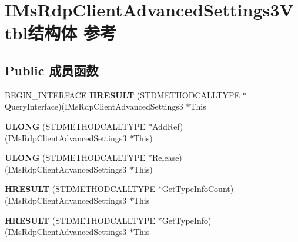 \hypertarget{struct_i_ms_rdp_client_advanced_settings3_vtbl}{}\section{I\+Ms\+Rdp\+Client\+Advanced\+Settings3\+Vtbl结构体 参考}
\label{struct_i_ms_rdp_client_advanced_settings3_vtbl}
\subsection*{Public 成员函数}
\begin{DoxyCompactItemize}
\item 
\mbox{\label{struct_i_ms_rdp_client_advanced_settings3_vtbl_a8f6d5e75d19efe4f0e09aeab838e5f19}} 
B\+E\+G\+I\+N\+\_\+\+I\+N\+T\+E\+R\+F\+A\+CE {\bfseries H\+R\+E\+S\+U\+LT} (S\+T\+D\+M\+E\+T\+H\+O\+D\+C\+A\+L\+L\+T\+Y\+PE $\ast$Query\+Interface)(I\+Ms\+Rdp\+Client\+Advanced\+Settings3 $\ast$This
\item 
\mbox{\label{struct_i_ms_rdp_client_advanced_settings3_vtbl_adad314645d965506fa7694e3a67dcc13}} 
{\bfseries U\+L\+O\+NG} (S\+T\+D\+M\+E\+T\+H\+O\+D\+C\+A\+L\+L\+T\+Y\+PE $\ast$Add\+Ref)(I\+Ms\+Rdp\+Client\+Advanced\+Settings3 $\ast$This)
\item 
\mbox{\label{struct_i_ms_rdp_client_advanced_settings3_vtbl_a4d757adae08a41e9eed936320e60cabb}} 
{\bfseries U\+L\+O\+NG} (S\+T\+D\+M\+E\+T\+H\+O\+D\+C\+A\+L\+L\+T\+Y\+PE $\ast$Release)(I\+Ms\+Rdp\+Client\+Advanced\+Settings3 $\ast$This)
\item 
\mbox{\label{struct_i_ms_rdp_client_advanced_settings3_vtbl_ae80f8694813050b1dd2f8fb9b12e8f93}} 
{\bfseries H\+R\+E\+S\+U\+LT} (S\+T\+D\+M\+E\+T\+H\+O\+D\+C\+A\+L\+L\+T\+Y\+PE $\ast$Get\+Type\+Info\+Count)(I\+Ms\+Rdp\+Client\+Advanced\+Settings3 $\ast$This
\item 
\mbox{\label{struct_i_ms_rdp_client_advanced_settings3_vtbl_a48859c33ee617bd43a3216d3a9015817}} 
{\bfseries H\+R\+E\+S\+U\+LT} (S\+T\+D\+M\+E\+T\+H\+O\+D\+C\+A\+L\+L\+T\+Y\+PE $\ast$Get\+Type\+Info)(I\+Ms\+Rdp\+Client\+Advanced\+Settings3 $\ast$This

\end{DoxyCompactItemize}
